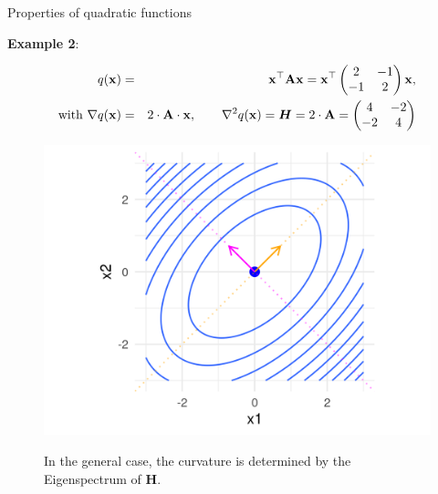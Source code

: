 \documentclass[11pt,compress,t,notes=noshow, xcolor=table]{beamer}
\begin{document}
  
  \begin{frame}{Properties of quadratic functions}
  
  \textbf{Example 2}:
  
  \vspace*{-0.3cm}
  
  \begin{eqnarray*}
    q(\mathbf{x}) &=& \mathbf{x}^\top \mathbf{A} \mathbf{x} = \mathbf{x}^\top\begin{pmatrix} 2 & -1 \\ -1 & 2\end{pmatrix} \mathbf{x}, \\
    \text{with } \nabla q(\mathbf{x}) &=& 2 \cdot \mathbf{A} \cdot \mathbf{x}, \qquad
    \nabla^2 q(\mathbf{x}) = \bm{H} = 2 \cdot \mathbf{A} = \begin{pmatrix} 4 & -2 \\ -2 & 4\end{pmatrix} 
  \end{eqnarray*}
  
  
  
   {
    \begin{figure}
      \includegraphics[height=0.35\textwidth, keepaspectratio]{figure_man/quadratic_functions_2D_example_1_7.png} \\
      \begin{footnotesize} 
        In the general case, the curvature is determined by the Eigenspectrum of $\bm{H}$. 
      \end{footnotesize}
    \end{figure}
  
}
\end{frame}
\end{document}
